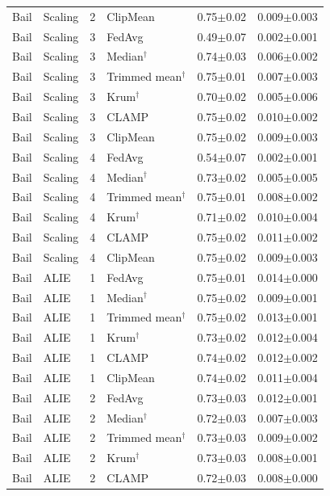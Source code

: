 \begin{longtable}{llclcc}
Bail & Scaling & 2 & ClipMean & 0.75$\pm$0.02 & 0.009$\pm$0.003 \\
Bail & Scaling & 3 & FedAvg & 0.49$\pm$0.07 & 0.002$\pm$0.001 \\
Bail & Scaling & 3 & Median$^\dagger$ & 0.74$\pm$0.03 & 0.006$\pm$0.002 \\
Bail & Scaling & 3 & Trimmed mean$^\dagger$ & 0.75$\pm$0.01 & 0.007$\pm$0.003 \\
Bail & Scaling & 3 & Krum$^\dagger$ & 0.70$\pm$0.02 & 0.005$\pm$0.006 \\
Bail & Scaling & 3 & CLAMP & 0.75$\pm$0.02 & 0.010$\pm$0.002 \\
Bail & Scaling & 3 & ClipMean & 0.75$\pm$0.02 & 0.009$\pm$0.003 \\
Bail & Scaling & 4 & FedAvg & 0.54$\pm$0.07 & 0.002$\pm$0.001 \\
Bail & Scaling & 4 & Median$^\dagger$ & 0.73$\pm$0.02 & 0.005$\pm$0.005 \\
Bail & Scaling & 4 & Trimmed mean$^\dagger$ & 0.75$\pm$0.01 & 0.008$\pm$0.002 \\
Bail & Scaling & 4 & Krum$^\dagger$ & 0.71$\pm$0.02 & 0.010$\pm$0.004 \\
Bail & Scaling & 4 & CLAMP & 0.75$\pm$0.02 & 0.011$\pm$0.002 \\
Bail & Scaling & 4 & ClipMean & 0.75$\pm$0.02 & 0.009$\pm$0.003 \\
Bail & ALIE & 1 & FedAvg & 0.75$\pm$0.01 & 0.014$\pm$0.000 \\
Bail & ALIE & 1 & Median$^\dagger$ & 0.75$\pm$0.02 & 0.009$\pm$0.001 \\
Bail & ALIE & 1 & Trimmed mean$^\dagger$ & 0.75$\pm$0.02 & 0.013$\pm$0.001 \\
Bail & ALIE & 1 & Krum$^\dagger$ & 0.73$\pm$0.02 & 0.012$\pm$0.004 \\
Bail & ALIE & 1 & CLAMP & 0.74$\pm$0.02 & 0.012$\pm$0.002 \\
Bail & ALIE & 1 & ClipMean & 0.74$\pm$0.02 & 0.011$\pm$0.004 \\
Bail & ALIE & 2 & FedAvg & 0.73$\pm$0.03 & 0.012$\pm$0.001 \\
Bail & ALIE & 2 & Median$^\dagger$ & 0.72$\pm$0.03 & 0.007$\pm$0.003 \\
Bail & ALIE & 2 & Trimmed mean$^\dagger$ & 0.73$\pm$0.03 & 0.009$\pm$0.002 \\
Bail & ALIE & 2 & Krum$^\dagger$ & 0.73$\pm$0.03 & 0.008$\pm$0.001 \\
Bail & ALIE & 2 & CLAMP & 0.72$\pm$0.03 & 0.008$\pm$0.000 \\

\end{longtable}

